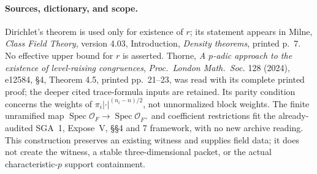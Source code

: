 \paragraph{Sources, dictionary, and scope.}
Dirichlet's theorem is used only for existence of \(r\); its statement appears in Milne, \emph{Class Field Theory}, version 4.03, Introduction, \emph{Density theorems}, printed p.\ 7. No effective upper bound for \(r\) is asserted. Thorne, \emph{A \(p\)-adic approach to the existence of level-raising congruences}, \emph{Proc.\ London Math.\ Soc.} 128 (2024), e12584, \S4, Theorem 4.5, printed pp.\ 21--23, was read with its complete printed proof; the deeper cited trace-formula inputs are retained. Its parity condition concerns the weights of \(\pi_i|\cdot|^{(n_i-n)/2}\), not unnormalized block weights.
The finite unramified map \(\operatorname{Spec}\mathcal O_F\to
\operatorname{Spec}\mathcal O_{F^+}\) and coefficient restrictions fit the
already-audited SGA~1, Expose~V, \S\S4 and 7 framework, with no new archive
reading. This construction preserves an existing witness and supplies
field data; it does not create the witness, a stable three-dimensional
packet, or the actual characteristic-\(p\) support containment.
